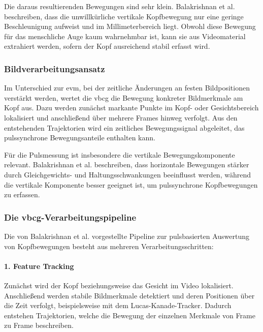 Die daraus resultierenden Bewegungen sind sehr klein. Balakrishnan et al. beschreiben, dass die unwillkürliche vertikale Kopfbewegung nur eine geringe Beschleunigung aufweist und im Millimeterbereich liegt. Obwohl diese Bewegung für das menschliche Auge kaum wahrnehmbar ist, kann sie aus Videomaterial extrahiert werden, sofern der Kopf ausreichend stabil erfasst wird.

\subsubsection{Bildverarbeitungsansatz}

Im Unterschied zur \ac{evm}, bei der zeitliche Änderungen an festen Bildpositionen verstärkt werden, wertet die \ac{vbcg} die Bewegung konkreter Bildmerkmale am Kopf aus. Dazu werden zunächst markante Punkte im Kopf- oder Gesichtsbereich lokalisiert und anschließend über mehrere Frames hinweg verfolgt. Aus den entstehenden Trajektorien wird ein zeitliches Bewegungssignal abgeleitet, das pulssynchrone Bewegungsanteile enthalten kann.

Für die Pulsmessung ist insbesondere die vertikale Bewegungskomponente relevant. Balakrishnan et al. beschreiben, dass horizontale Bewegungen stärker durch Gleichgewichts- und Haltungsschwankungen beeinflusst werden, während die vertikale Komponente besser geeignet ist, um pulssynchrone Kopfbewegungen zu erfassen.

\subsubsection{Die \acs{vbcg}-Verarbeitungspipeline}
Die von Balakrishnan et al. vorgestellte Pipeline zur pulsbasierten Auswertung von Kopfbewegungen besteht aus mehreren Verarbeitungsschritten:

\paragraph{1. Feature Tracking} Zunächst wird der Kopf beziehungsweise das Gesicht im Video lokalisiert. Anschließend werden stabile Bildmerkmale detektiert und deren Positionen über die Zeit verfolgt, beispielsweise mit dem Lucas-Kanade-Tracker. Dadurch entstehen Trajektorien, welche die Bewegung der einzelnen Merkmale von Frame zu Frame beschreiben.


